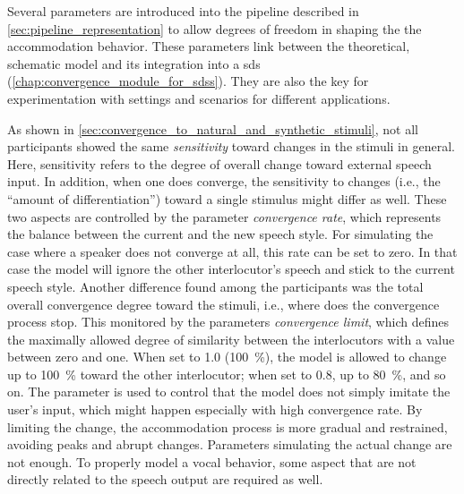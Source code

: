 Several parameters are introduced into the pipeline described in \cref{sec:pipeline_representation} to allow degrees of freedom in shaping the the accommodation behavior.
These parameters link between the theoretical, schematic model and its integration into a \ac{sds} (\cref{chap:convergence_module_for_sdss}).
They are also the key for experimentation with settings and scenarios for different applications.

As shown in \cref{sec:convergence_to_natural_and_synthetic_stimuli}, not all participants showed the same \textit{sensitivity} toward changes in the stimuli in general.
Here, sensitivity refers to the degree of overall change toward external speech input.
In addition, when one does converge, the sensitivity to changes (i.e., the \enquote{amount of differentiation}) toward a single stimulus might differ as well.
These two aspects are controlled by the parameter \textit{convergence rate}, which represents the balance between the current and the new speech style.
For simulating the case where a speaker does not converge at all, this rate can be set to zero.
In that case the model will ignore the other interlocutor's speech and stick to the current speech style.
Another difference found among the participants was the total overall convergence degree toward the stimuli, i.e., where does the convergence process stop.
This monitored by the parameters \textit{convergence limit}, which defines the maximally allowed degree of similarity between the interlocutors with a value between zero and one.
When set to 1.0 (\SI{100}{\percent}), the model is allowed to change up to \SI{100}{\percent} toward the other interlocutor; when set to 0.8, up to \SI{80}{\percent}, and so on.
The parameter is used to control that the model does not simply imitate the user's input, which might happen especially with high convergence rate.
By limiting the change, the accommodation process is more gradual and restrained, avoiding peaks and abrupt changes.
Parameters simulating the actual change are not enough.
To properly model a vocal behavior, some aspect that are not directly related to the speech output are required as well.

